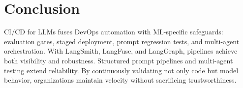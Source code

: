 \section{Conclusion}
\label{sec:cicd-conclusion}
CI/CD for LLMs fuses DevOps automation with ML-specific safeguards: evaluation gates, staged deployment, prompt regression tests, and multi-agent orchestration. With LangSmith, LangFuse, and LangGraph, pipelines achieve both visibility and robustness. Structured prompt pipelines and multi-agent testing extend reliability. By continuously validating not only code but model behavior, organizations maintain velocity without sacrificing trustworthiness.

\printbibliography[
  heading=subbibliography,
  segment=\therefsegment,
  resetnumbers=true
]

